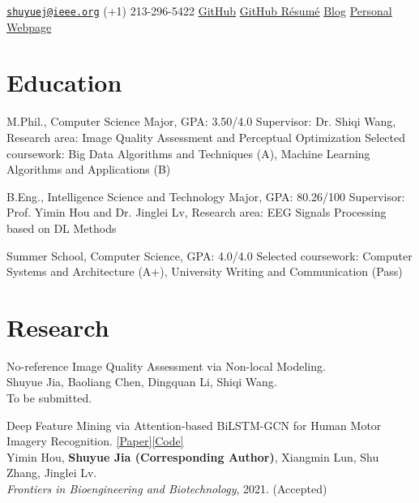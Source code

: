 \documentclass{my_cv}
\begin{document}
\hspace*{\fill}


\hspace*{\fill}

\longcontact
{\href{mailto:shuyuej@ieee.org}{\nolinkurl{shuyuej@ieee.org}}}
{(+1) 213-296-5422}
{\href{https://github.com/SuperBruceJia}{GitHub}}
{\href{https://resume.github.io/?SuperBruceJia}{GitHub Résumé}}
{\href{http://shuyuej.com/blog}{Blog}}
{\href{https://shuyuej.com/}{Personal Webpage}}

\hspace*{\fill} 

\section{Education}
\workitemsthree
{M.Phil., Computer Science Major, GPA: 3.50/4.0}
{Supervisor: Dr. Shiqi Wang, Research area: Image Quality Assessment and Perceptual Optimization}
{Selected coursework: Big Data Algorithms and Techniques (A), Machine Learning Algorithms and Applications (B)}

\workitemstwo
{B.Eng., Intelligence Science and Technology Major, GPA: 80.26/100}
{Supervisor: Prof. Yimin Hou and Dr. Jinglei Lv, Research area: EEG Signals Processing based on DL Methods}

\workitemstwo
{Summer School, Computer Science, GPA: 4.0/4.0}
{Selected coursework: Computer Systems and Architecture (A+), University Writing and Communication (Pass)}

\hspace*{\fill}

\section{Research}

\workitemsone
{No-reference Image Quality Assessment via Non-local Modeling. \\
	Shuyue Jia, Baoliang Chen, Dingquan Li, Shiqi Wang. \\
	To be submitted.
}

\hspace*{\fill}

\workitemsone
{Deep Feature Mining via Attention-based BiLSTM-GCN for Human Motor Imagery Recognition. \href{https://www.frontiersin.org/articles/10.3389/fbioe.2021.706229/abstract}{[Paper]}\href{https://github.com/SuperBruceJia/EEG-DL}{[Code]}\\
	Yimin Hou, \textbf{Shuyue Jia (Corresponding Author)}, Xiangmin Lun, Shu Zhang, Jinglei Lv. \\
	\emph{Frontiers in Bioengineering and Biotechnology}, 2021. (Accepted)
}
\end{document}
